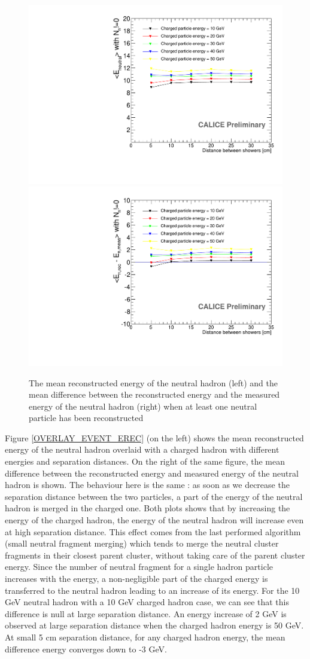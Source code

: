 \documentclass[cits]{JINST}
\begin{document}
\begin{figure}[!h]
  \begin{center}
    \includegraphics[width=0.47\linewidth]{plots/OverlayEvent_NeutralEnergyMeanNeutralEfficient.pdf}
    \includegraphics[width=0.47\linewidth]{plots/OverlayEvent_NeutralEnergyDifferenceMeanNeutralEfficient.pdf}
  \end{center}
  \caption{\label{OVERLAY_EVENT_EREC_NEUTRAL_EFFICIENT} The mean reconstructed energy of the neutral hadron (left) and the mean difference between the reconstructed energy and the measured energy of the neutral hadron (right) when at least one neutral particle has been reconstructed}
\end{figure}

Figure \ref{OVERLAY_EVENT_EREC} (on the left) shows the mean reconstructed energy of the neutral hadron overlaid with a charged hadron with different energies and separation distances. On the right of the same figure, the mean difference between the reconstructed energy and measured energy of the neutral hadron is shown. The behaviour here is the same : as soon as we decrease the separation distance between the two particles, a part of the energy of the neutral hadron is merged in the charged one. Both plots shows that by increasing the energy of the charged hadron, the energy of the neutral hadron will increase even at high separation distance. This effect comes from the last performed algorithm (small neutral fragment merging) which tends to merge the neutral cluster fragments in their closest parent cluster, without taking care of the parent cluster energy. Since the number of neutral fragment for a single hadron particle increases with the energy, a non-negligible part of the charged energy is transferred to the neutral hadron leading to an increase of its energy. For the 10 GeV neutral hadron with a 10 GeV charged hadron case, we can see that this difference is null at large separation distance. An energy increase of 2 GeV is observed at large separation distance when the charged hadron energy is 50 GeV. At small 5 cm separation distance, for any charged hadron energy, the mean difference energy converges down to -3 GeV. 
\end{document}
